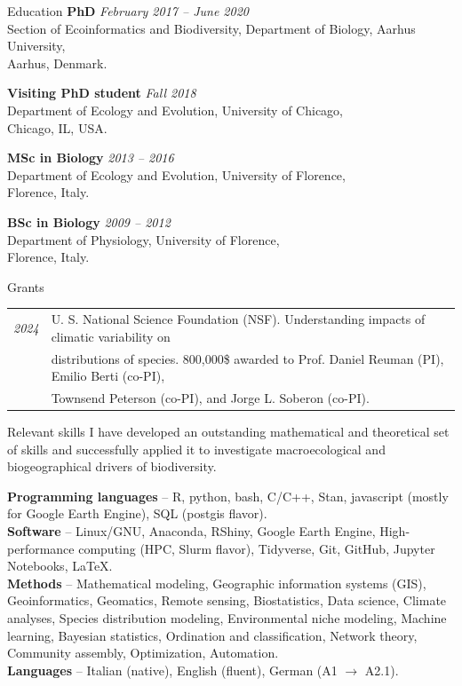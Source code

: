 \documentclass{resume} %
\begin{document}
\begin{rSection}{Education}
{\bf PhD} \hfill {\em February 2017 -- June 2020} \\
Section of Ecoinformatics and Biodiversity, Department of Biology, Aarhus University,\\Aarhus, Denmark.

{\bf Visiting PhD student} \hfill {\em Fall 2018} \\
Department of Ecology and Evolution, University of Chicago,\\Chicago, IL, USA.

{\bf MSc in Biology} \hfill {\em 2013 -- 2016} \\
Department of Ecology and Evolution, University of Florence,\\Florence, Italy.

{\bf BSc in Biology} \hfill {\em 2009 -- 2012} \\
Department of Physiology, University of Florence,\\Florence, Italy.
\end{rSection}

\begin{rSection}{Grants}
\begin{tabular}{l l}
{\em 2024} & U. S. National Science Foundation (NSF). Understanding impacts of climatic variability on\\
           & distributions of species. 800,000\$ awarded to Prof. Daniel Reuman (PI), Emilio Berti (co-PI),\\
           & Townsend Peterson (co-PI), and Jorge L. Soberon (co-PI).
\end{tabular}
\end{rSection}

\begin{rSection}{Relevant skills}
I have developed an outstanding mathematical and theoretical set of skills and successfully applied it to
investigate macroecological and biogeographical drivers of biodiversity.

\textbf{Programming languages} – R, python, bash, C/C++, Stan, javascript (mostly for Google Earth Engine), SQL (postgis flavor).\\
\textbf{Software} – Linux/GNU, Anaconda, RShiny, Google Earth Engine, High-performance computing (HPC, Slurm flavor), Tidyverse, Git, GitHub, Jupyter Notebooks, \LaTeX.\\
\textbf{Methods} – Mathematical modeling, Geographic information systems (GIS), Geoinformatics, Geomatics, Remote sensing, Biostatistics, Data science, Climate analyses, Species distribution modeling, Environmental niche modeling, Machine learning, Bayesian statistics, Ordination and classification, Network theory,
Community assembly, Optimization, Automation.\\
\textbf{Languages} – Italian (native), English (fluent), German (A1 $\rightarrow$ A2.1).
\end{rSection}
\end{document}
